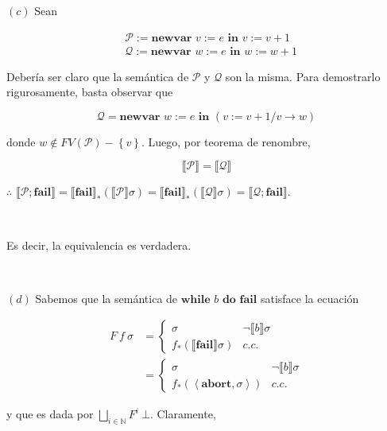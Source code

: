 \documentclass[article, 12pt]{article}
\begin{document}
$(c)$ Sean

\begin{align*}
  &\mathcal{P} := \textbf{newvar } v := e \textbf{ in } v := v+1
  \\
  &\mathcal{Q} := \textbf{newvar } w := e \textbf{ in } w := w+1
\end{align*}

Debería ser claro que la semántica de $\mathcal{P}$ y $\mathcal{Q}$ son la
misma. Para demostrarlo rigurosamente, basta observar que 

\begin{equation*}
  \mathcal{Q} = \textbf{newvar } w := e \textbf{ in } (v := v + 1 / v \to w)
\end{equation*}

donde $w \not\in FV(\mathcal{P}) - \left\{ v \right\} $. Luego, por teorema de
renombre, 

\begin{equation*}
  \llbracket \mathcal{P} \rrbracket = \llbracket \mathcal{Q} \rrbracket
\end{equation*}

$\therefore $ $\llbracket \mathcal{P};\textbf{fail} \rrbracket = \llbracket
\textbf{fail} \rrbracket_* \left( \llbracket \mathcal{P} \rrbracket\sigma
\right) = \llbracket \textbf{fail} \rrbracket_* \left( \llbracket \mathcal{Q}
\rrbracket\sigma \right) = \llbracket \mathcal{Q};\textbf{fail} \rrbracket$.

~

Es decir, la equivalencia es verdadera.


~ 

$(d)$ Sabemos que la semántica de $\textbf{while } b \textbf{ do }
\textbf{fail}$ satisface la ecuación 

\begin{align*}
  F ~ f ~ \sigma 
  &= \begin{cases}
    \sigma & \neg \llbracket b \rrbracket\sigma \\ 
    f_*\left( \llbracket \textbf{fail} \rrbracket\sigma \right) &c.c.
  \end{cases} \\ 
  &=\begin{cases}
    \sigma & \neg \llbracket b \rrbracket\sigma \\ 
    f_* \left( \left<\textbf{abort}, \sigma \right> \right) & c.c.
  \end{cases}
\end{align*}

y que es dada por $\bigsqcup_{i \in \mathbb{N}} F^i ~ \bot $. Claramente, 
\end{document}
